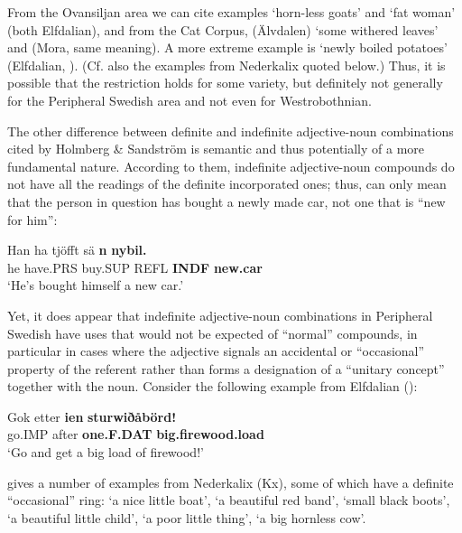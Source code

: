 From the Ovansiljan area we can cite \citet[52]{Levander1909} examples  ‘horn-less goats’ and  ‘fat woman’ (both Elfdalian), and from the Cat Corpus,  (Älvdalen) ‘some withered leaves’ and (Mora, same meaning). A more extreme example is \textbf{ }‘newly boiled potatoes’ (Elfdalian, \citet[201]{Åkerberg2012}). (Cf. also the examples from Nederkalix quoted below.) Thus, it is possible that the restriction holds for some variety, but definitely not generally for the Peripheral Swedish area and not even for Westrobothnian. 

The other difference between definite and indefinite adjective-noun combinations cited by Holmberg \& Sandström is semantic and thus potentially of a more fundamental nature. According to them, indefinite adjective-noun compounds do not have all the readings of the definite incorporated ones; thus,  can only mean that the person in question has bought a newly made car, not one that is “new for him”:

\ea\label{}
\gll Han  ha  tjöfft  sä  \textbf{n}\textbf{  nybil.}\\
he  have.PRS  buy.SUP  REFL  \textbf{INDF} \textbf{new.car}\\
\glt ‘He’s bought himself a new car.’
\z

Yet, it does appear that indefinite adjective-noun combinations in Peripheral Swedish have uses that would not be expected of “normal” compounds, in particular in cases where the adjective signals an accidental or “occasional” property of the referent rather than forms a designation of a “unitary concept” together with the noun. Consider the following example from Elfdalian (\citet[142]{Levander1909}):

\ea\label{}
\gll Gok  etter  \textbf{ien} \textbf{sturwiðåbörd!}\\
go.IMP  after  \textbf{one.F.DAT} \textbf{big.firewood.load}\\
\glt ‘Go and get a big load of firewood!’ 
\z

\citet[141]{Rutberg1924} gives a number of examples from Nederkalix (Kx), some of which have a definite “occasional” ring: ‘a nice little boat’,  ‘a beautiful red band’,  ‘small black boots’,  ‘a beautiful little child’,  ‘a poor little thing’,  ‘a big hornless cow’.

